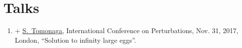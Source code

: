 


\section{Talks}


\TalksInstructions	%
	\begin{enumerate}
		\item + \underline{S.~Tomonaga},
			International Conference on Perturbations,
			Nov. 31, 2017, London,
			``Solution to infinity large eggs''.
	\end{enumerate}



